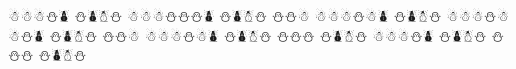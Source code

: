\documentclass{article}
\begin{document}
\begin{whitesnowman}
☃☃☃⛄⛇ %
⛄⛇☃⛄
☃☃☃⛄⛄⛄⛇ %
⛄⛇☃⛄
⛄⛄☃ %
☃☃☃⛄☃⛇ %
⛄⛇☃⛄
☃☃☃⛄☃☃⛄⛇ %
⛄⛇☃⛄
⛄⛄☃ %
☃☃☃⛄☃⛇ %
⛄⛇☃⛄
⛄⛄⛄ %
⛄⛇☃⛄
☃☃☃⛄⛇ %
⛄⛇☃⛄
⛄⛄⛄ %
⛄⛇☃⛄
\end{whitesnowman}
\end{document}
